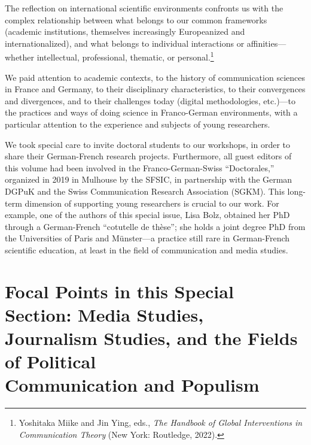 \documentclass{tufte-handout}
\begin{document}
The reflection on international scientific environments confronts us
with the complex relationship between what belongs to our common
frameworks (academic institutions, themselves increasingly Europeanized
and internationalized), and what belongs to individual interactions or
affinities---whether intellectual, professional, thematic, or
personal.\footnote{Yoshitaka Miike and Jin Ying, eds., \emph{The
  Handbook of Global Interventions in Communication Theory} (New York:
  Routledge, 2022).}

We paid attention to academic contexts, to the history of communication
sciences in France and Germany, to their disciplinary characteristics,
to their convergences and divergences, and to their challenges today
(digital methodologies, etc.)---to the practices and ways of doing
science in Franco-German environments, with a particular attention to
the experience and subjects of young researchers.

We took special care to invite doctoral students to our workshops, in
order to share their German-French research projects. Furthermore, all
guest editors of this volume had been involved in the
Franco-German-Swiss ``Doctorales,'' organized in 2019 in Mulhouse by the
SFSIC, in partnership with the German DGPuK and the Swiss Communication
Research Association (SGKM). This long-term dimension of supporting
young researchers is crucial to our work. For example, one of the
authors of this special issue, Lisa Bolz, obtained her PhD through a
German-French ``cotutelle de thèse''; she holds a joint degree PhD from
the Universities of Paris and Münster---a practice still rare in
German-French scientific education, at least in the field of
communication and media studies.

\hypertarget{focal-points-in-this-special-section-media-studies-journalism-studies-and-the-fields-of-political-communication-and-populism}{%
\section{Focal Points in this Special Section: Media Studies,\\\noindent
Journalism Studies, and the Fields of Political\\\noindent Communication and
Populism}\label{focal-points-in-this-special-section-media-studies-journalism-studies-and-the-fields-of-political-communication-and-populism}}
\end{document}
